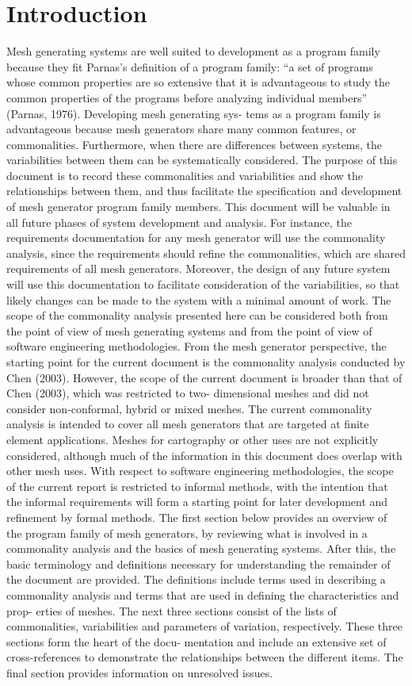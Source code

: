 \documentclass[12pt]{article}
\begin{document}
\section{Introduction}
Mesh generating systems are well suited to development as a program family because they
fit Parnas’s definition of a program family: “a set of programs whose common properties
are so extensive that it is advantageous to study the common properties of the programs
before analyzing individual members” (Parnas, 1976). Developing mesh generating sys-
tems as a program family is advantageous because mesh generators share many common
features, or commonalities. Furthermore, when there are differences between systems, the
variabilities between them can be systematically considered. The purpose of this document
is to record these commonalities and variabilities and show the relationships between them,
and thus facilitate the specification and development of mesh generator program family
members. This document will be valuable in all future phases of system development and
analysis. For instance, the requirements documentation for any mesh generator will use
the commonality analysis, since the requirements should refine the commonalities, which
are shared requirements of all mesh generators. Moreover, the design of any future system
will use this documentation to facilitate consideration of the variabilities, so that likely
changes can be made to the system with a minimal amount of work.
The scope of the commonality analysis presented here can be considered both from the
point of view of mesh generating systems and from the point of view of software engineering
methodologies. From the mesh generator perspective, the starting point for the current
document is the commonality analysis conducted by Chen (2003). However, the scope of
the current document is broader than that of Chen (2003), which was restricted to two-
dimensional meshes and did not consider non-conformal, hybrid or mixed meshes. The
current commonality analysis is intended to cover all mesh generators that are targeted
at finite element applications. Meshes for cartography or other uses are not explicitly
considered, although much of the information in this document does overlap with other
mesh uses. With respect to software engineering methodologies, the scope of the current
report is restricted to informal methods, with the intention that the informal requirements
will form a starting point for later development and refinement by formal methods.
The first section below provides an overview of the program family of mesh generators,
by reviewing what is involved in a commonality analysis and the basics of mesh generating
systems. After this, the basic terminology and definitions necessary for understanding the
remainder of the document are provided. The definitions include terms used in describing
a commonality analysis and terms that are used in defining the characteristics and prop-
erties of meshes. The next three sections consist of the lists of commonalities, variabilities
and parameters of variation, respectively. These three sections form the heart of the docu-
mentation and include an extensive set of cross-references to demonstrate the relationships
between the different items. The final section provides information on unresolved issues.
\end{document}

